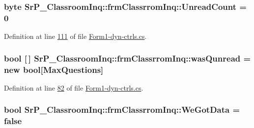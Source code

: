 \hypertarget{class_sr_p___classroom_inq_1_1frm_classrrom_inq_a9978aff45fb1057f102e224f8485f096}{
\subsubsection[{\-Unread\-Count}]{\setlength{\rightskip}{0pt plus 5cm}byte {\bf \-Sr\-P\-\_\-\-Classroom\-Inq\-::frm\-Classrrom\-Inq\-::\-Unread\-Count} = 0}}
\label{class_sr_p___classroom_inq_1_1frm_classrrom_inq_a9978aff45fb1057f102e224f8485f096}


\-Definition at line \hyperlink{_form1-dyn-ctrls_8cs_source_l00111}{111} of file \hyperlink{_form1-dyn-ctrls_8cs_source}{\-Form1-\/dyn-\/ctrls.\-cs}.

\hypertarget{class_sr_p___classroom_inq_1_1frm_classrrom_inq_adc405f927295c61b4675a8b28142c645}{
\subsubsection[{was\-Qunread}]{\setlength{\rightskip}{0pt plus 5cm}bool \mbox{[}$\,$\mbox{]} {\bf \-Sr\-P\-\_\-\-Classroom\-Inq\-::frm\-Classrrom\-Inq\-::was\-Qunread} = new bool\mbox{[}{\bf \-Max\-Questions}\mbox{]}}}
\label{class_sr_p___classroom_inq_1_1frm_classrrom_inq_adc405f927295c61b4675a8b28142c645}


\-Definition at line \hyperlink{_form1-dyn-ctrls_8cs_source_l00082}{82} of file \hyperlink{_form1-dyn-ctrls_8cs_source}{\-Form1-\/dyn-\/ctrls.\-cs}.

\hypertarget{class_sr_p___classroom_inq_1_1frm_classrrom_inq_a44eb31e84ef4705e39c15c4d6047807e}{
\subsubsection[{\-We\-Got\-Data}]{\setlength{\rightskip}{0pt plus 5cm}bool {\bf \-Sr\-P\-\_\-\-Classroom\-Inq\-::frm\-Classrrom\-Inq\-::\-We\-Got\-Data} = false}}
\label{class_sr_p___classroom_inq_1_1frm_classrrom_inq_a44eb31e84ef4705e39c15c4d6047807e}



